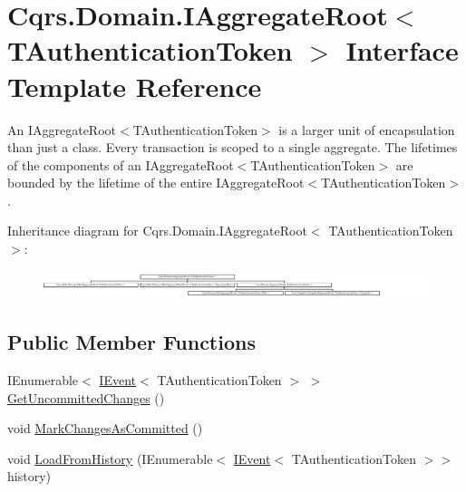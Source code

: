 \hypertarget{interfaceCqrs_1_1Domain_1_1IAggregateRoot}{}\section{Cqrs.\+Domain.\+I\+Aggregate\+Root$<$ T\+Authentication\+Token $>$ Interface Template Reference}
\label{interfaceCqrs_1_1Domain_1_1IAggregateRoot}


An I\+Aggregate\+Root$<$\+T\+Authentication\+Token$>$ is a larger unit of encapsulation than just a class. Every transaction is scoped to a single aggregate. The lifetimes of the components of an I\+Aggregate\+Root$<$\+T\+Authentication\+Token$>$ are bounded by the lifetime of the entire I\+Aggregate\+Root$<$\+T\+Authentication\+Token$>$.  


Inheritance diagram for Cqrs.\+Domain.\+I\+Aggregate\+Root$<$ T\+Authentication\+Token $>$\+:\begin{figure}[H]
\begin{center}
\leavevmode
\includegraphics[height=0.810811cm]{interfaceCqrs_1_1Domain_1_1IAggregateRoot}
\end{center}
\end{figure}
\subsection*{Public Member Functions}
\begin{DoxyCompactItemize}
\item 
I\+Enumerable$<$ \hyperlink{interfaceCqrs_1_1Events_1_1IEvent}{I\+Event}$<$ T\+Authentication\+Token $>$ $>$ \hyperlink{interfaceCqrs_1_1Domain_1_1IAggregateRoot_a22fda414613f5ac0d4371554d7d6473b_a22fda414613f5ac0d4371554d7d6473b}{Get\+Uncommitted\+Changes} ()
\item 
void \hyperlink{interfaceCqrs_1_1Domain_1_1IAggregateRoot_af31116870bbf6566b3eec0b8bc02c6de_af31116870bbf6566b3eec0b8bc02c6de}{Mark\+Changes\+As\+Committed} ()
\item 
void \hyperlink{interfaceCqrs_1_1Domain_1_1IAggregateRoot_afe9329ee26ae68613059189ca64dfe60_afe9329ee26ae68613059189ca64dfe60}{Load\+From\+History} (I\+Enumerable$<$ \hyperlink{interfaceCqrs_1_1Events_1_1IEvent}{I\+Event}$<$ T\+Authentication\+Token $>$$>$ history)
\end{DoxyCompactItemize}
